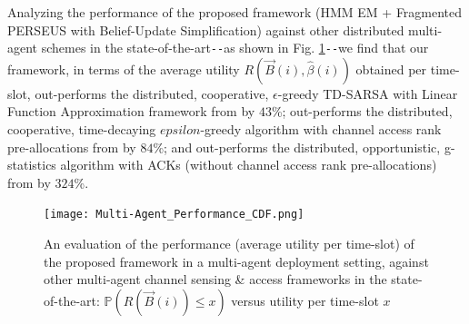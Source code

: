 \documentclass[12pt, draftcls, onecolumn]{IEEEtran}
\begin{document}
Analyzing the performance of the proposed framework (HMM EM + Fragmented PERSEUS with Belief-Update Simplification) against other distributed multi-agent schemes in the state-of-the-art\texttt{-{}-}as shown in Fig. \ref{fig: Z. 2}\texttt{-{}-}we find that our framework, in terms of the average utility $R(\vec{B}(i), \hat{\beta}(i))$ obtained per time-slot, out-performs the distributed, cooperative, $\epsilon$-greedy TD-SARSA with Linear Function Approximation framework from \cite{WCL:5} by $43$\%; out-performs the distributed, cooperative, time-decaying $epsilon$-greedy algorithm with channel access rank pre-allocations from \cite{WCL:MIT} by $84$\%; and out-performs the distributed, opportunistic, g-statistics algorithm with ACKs (without channel access rank pre-allocations) from \cite{WCL:MIT} by $324$\%.
\begin{figure} [htb]
    \centerline{
    \texttt{[image: Multi-Agent\_Performance\_CDF.png]}}
    \caption{An evaluation of the performance (average utility per time-slot) of the proposed framework in a multi-agent deployment setting, against other multi-agent channel sensing \& access frameworks in the state-of-the-art: $\mathbb{P}(R(\vec{B}(i)){\leq}x)$ versus utility per time-slot $x$}
    \label{fig: Z. 2}
\end{figure}
\end{document}
